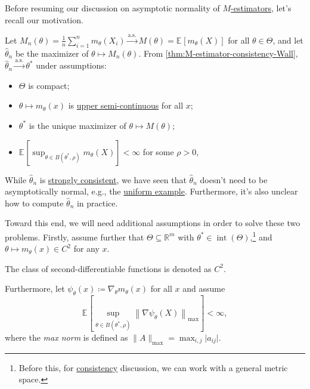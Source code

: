 Before resuming our discussion on asymptotic normality of \hyperref[def:M-estimator]{\(M\)-estimators}, let's recall our motivation.

\begin{prev}
	Let \(M_n(\theta ) = \frac{1}{n}\sum_{i=1}^{n} m_\theta (X_i) \overset{\text{a.s.} }{\to} M(\theta ) = \mathbb{E}_{}[m_\theta (X)] \) for all \(\theta \in \Theta \), and let \(\hat{\theta} _n\) be the maximizer of \(\theta \mapsto M_n(\theta )\). From \autoref{thm:M-estimator-consistency-Wall}, \(\hat{\theta} _n \overset{\text{a.s.} }{\to} \theta ^{\ast} \) under assumptions:
	\begin{itemize}
		\item \(\Theta \) is compact;
		\item \(\theta \mapsto m_\theta (x)\) is \hyperref[def:upper-semi-continuous]{upper semi-continuous} for all \(x\);
		\item \(\theta ^{\ast} \) is the unique maximizer of \(\theta \mapsto M(\theta )\);
		\item \(\mathbb{E}_{}[\sup _{\theta \in B(\theta ^{\ast} , \rho )} m_\theta (X)] < \infty \) for some \(\rho > 0\),
	\end{itemize}
	While \(\hat{\theta} _n\) is \hyperref[def:strongly-consistent]{strongly consistent}, we have seen that \(\hat{\theta} _n\) doesn't need to be asymptotically normal, e.g., the \hyperref[eg:uniform-is-not-asymptotically-normal]{uniform example}. Furthermore, it's also unclear how to compute \(\hat{\theta} _n\) in practice.
\end{prev}

Toward this end, we will need additional assumptions in order to solve these two problems. Firstly, assume further that \(\Theta \subseteq \mathbb{R} ^m\) with \(\theta ^{\ast} \in \operatorname{int}(\Theta ) \),\footnote{Before this, for \hyperref[def:consistent]{consistency} discussion, we can work with a general metric space.} and \(\theta \mapsto m_\theta (x) \in C^2\) for any \(x\).

\begin{notation}
	The class of second-differentiable functions is denoted as \(C^2\).
\end{notation}

Furthermore, let \(\psi _\theta (x) \coloneqq \nabla _\theta m_\theta (x)\) for all \(x\) and assume
\[
	\mathbb{E}_{}\left[\sup _{\theta \in \overline{B(\theta ^{\ast} , \rho )} } \left\lVert \nabla \psi _\theta (X) \right\rVert _{\max }\right] < \infty,
\]
where the \emph{max norm} is defined as \(\lVert A \rVert _{\max } = \max _{i, j} \lvert a_{ij} \rvert \).

